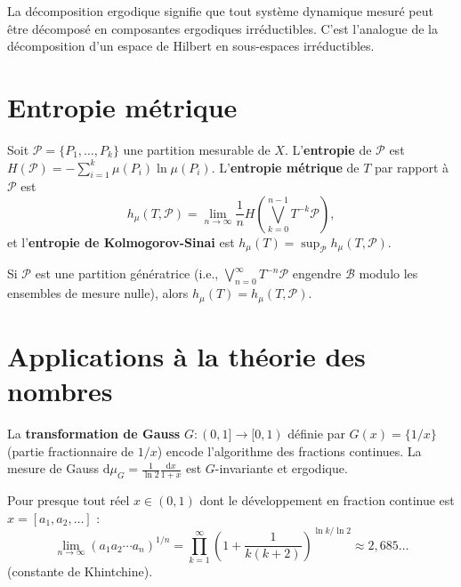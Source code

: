 \begin{remarque}
La d\'ecomposition ergodique signifie que tout syst\`eme dynamique mesur\'e
peut \^etre d\'ecompos\'e en \og composantes ergodiques \fg irr\'eductibles.
C'est l'analogue de la d\'ecomposition d'un espace de Hilbert en sous-espaces
irr\'eductibles.
\end{remarque}

\section{Entropie m\'etrique}

\begin{definition}
Soit $\mathcal{P} = \{P_1, \ldots, P_k\}$ une partition mesurable de $X$.
L'\textbf{entropie} de $\mathcal{P}$ est $H(\mathcal{P}) = -\sum_{i=1}^k
\mu(P_i) \ln \mu(P_i)$. L'\textbf{entropie m\'etrique} de $T$ par rapport
\`a $\mathcal{P}$ est
\[
    h_\mu(T, \mathcal{P}) = \lim_{n \to \infty} \frac{1}{n}
    H\left(\bigvee_{k=0}^{n-1} T^{-k}\mathcal{P}\right),
\]
et l'\textbf{entropie de Kolmogorov-Sinai} est
$h_\mu(T) = \sup_{\mathcal{P}} h_\mu(T, \mathcal{P})$.
\end{definition}

\begin{theoreme}
Si $\mathcal{P}$ est une partition g\'en\'eratrice (i.e.,
$\bigvee_{n=0}^{\infty} T^{-n}\mathcal{P}$ engendre $\mathcal{B}$
modulo les ensembles de mesure nulle), alors
$h_\mu(T) = h_\mu(T, \mathcal{P})$.
\end{theoreme}

\section{Applications \`a la th\'eorie des nombres}

\begin{exemple}
La \textbf{transformation de Gauss} $G : (0, 1] \to [0, 1)$ d\'efinie par
$G(x) = \{1/x\}$ (partie fractionnaire de $1/x$) encode l'algorithme des
fractions continues. La mesure de Gauss
$\mathrm{d}\mu_G = \frac{1}{\ln 2} \frac{\mathrm{d}x}{1 + x}$
est $G$-invariante et ergodique.
\end{exemple}

\begin{corollaire}
Pour presque tout r\'eel $x \in (0,1)$ dont le d\'eveloppement en fraction
continue est $x = [a_1, a_2, \ldots]$ :
\[
    \lim_{n \to \infty} (a_1 a_2 \cdots a_n)^{1/n}
    = \prod_{k=1}^{\infty} \left(1 + \frac{1}{k(k+2)}\right)^{\ln k / \ln 2}
    \approx 2{,}685\ldots
\]
(constante de Khintchine).
\end{corollaire}

